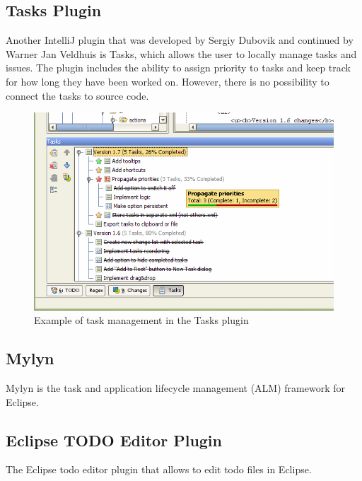 \documentclass{4thYearProject}
\begin{document}
\subsection{Tasks Plugin}

Another IntelliJ plugin that was developed by Sergiy Dubovik and continued by Warner Jan Veldhuis is Tasks, which allows the user to locally manage tasks and issues. The plugin includes the ability to assign priority to tasks and keep track for how long they have been worked on. However, there is no possibility to connect the tasks to source code. 

\begin{figure}[H]
\includegraphics[scale=0.6]{Tasks}
\centering
\caption{Example of task management in the Tasks plugin}\label{tasks}
\label{fig:tasks}
\end{figure}

\subsection{Mylyn}

Mylyn is the task and application lifecycle management (ALM) framework for Eclipse. 

\subsection{Eclipse TODO Editor Plugin}

The Eclipse todo editor plugin that allows to edit todo files in Eclipse. 
\end{document}
